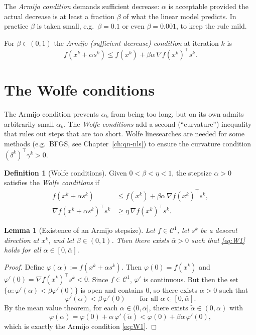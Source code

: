 \documentclass[11pt,a4paper]{report}
\theoremstyle{plain}
\newtheorem{lemma}[theorem]{Lemma}
\theoremstyle{definition}
\newtheorem{definition}[theorem]{Definition}
\newcommand{\grad}{\nabla}
\newcommand{\trans}{^{\top}}
\begin{document}
The \emph{Armijo condition} demands sufficient decrease: $\alpha$ is acceptable
provided the actual decrease is at least a fraction $\beta$ of what the linear model
predicts. In practice $\beta$ is taken small, e.g.\ $\beta=0.1$ or even $\beta=0.001$,
to keep the rule mild.

For $\beta\in(0,1)$ the \emph{Armijo (sufficient decrease) condition} at
iteration $k$ is
\begin{equation}\label{eq:armijo}\tag{ac}
f(x^{k}+\alpha s^{k})\le f(x^{k})+\beta\alpha\,\grad f(x^{k})\trans s^{k}.
\end{equation}

\section{The Wolfe conditions}

The Armijo condition prevents $\alpha_{k}$ from being too long, but on its own
admits arbitrarily small $\alpha_{k}$. The \emph{Wolfe conditions} add a second
(``curvature'') inequality that rules out steps that are too short. Wolfe linesearches
are needed for some methods (e.g.\ BFGS, see Chapter~\ref{ch:qn-nls}) to ensure
the curvature condition $(\delta^{k})\trans\gamma^{k}>0$.

\begin{definition}[Wolfe conditions]
Given $0<\beta<\eta<1$, the stepsize $\alpha>0$ satisfies the \emph{Wolfe conditions} if
\begin{align}
f(x^{k}+\alpha s^{k})&\le f(x^{k})+\beta\alpha\,\grad f(x^{k})\trans s^{k},
\tag{W1}\label{eq:W1}\\
\grad f(x^{k}+\alpha s^{k})\trans s^{k}&\ge \eta\,\grad f(x^{k})\trans s^{k}.
\tag{W2}\label{eq:W2}
\end{align}
\end{definition}

\begin{lemma}[Existence of an Armijo stepsize]\label{lem:armijo-exist}
Let $f\in\mathcal{C}^{1}$, let $s^{k}$ be a descent direction at $x^{k}$, and let
$\beta\in(0,1)$. Then there exists $\bar{\alpha}>0$ such that \eqref{eq:W1} holds
for all $\alpha\in[0,\bar{\alpha}]$.
\end{lemma}
\begin{proof}
Define $\varphi(\alpha):=f(x^{k}+\alpha s^{k})$. Then $\varphi(0)=f(x^{k})$ and
$\varphi'(0)=\grad f(x^{k})\trans s^{k}<0$. Since $f \in \mathcal{C}^1$, $\varphi'$ is continuous. But then the set $\{\alpha : \varphi'(\alpha) < \beta \varphi'(0)\}$ is open and contains 0, so there exists $\bar{\alpha}>0$ such that
\[
\varphi'(\alpha)< \beta\,\varphi'(0)\qquad\text{for all }\alpha\in[0,\bar{\alpha}].
\]
By the mean value theorem, for each $\alpha\in(0,\bar{\alpha}]$, there exists $\tilde{\alpha}\in(0,\alpha)$ with
\[
\varphi(\alpha)=\varphi(0)+\alpha\,\varphi'(\tilde{\alpha})
<\varphi(0)+\beta\alpha\,\varphi'(0),
\]
which is exactly the Armijo condition \eqref{eq:W1}.
\end{proof}
\end{document}
